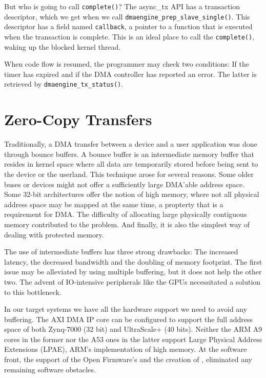 But who is going to call \texttt{complete()}? The async\_tx API has a transaction descriptor, 
which we get when we call \texttt{dmaengine\_prep\_slave\_single()}.
This descriptor has a field named \texttt{callback}, a pointer to a function
that is executed when the transaction is complete. This is an ideal place
to call the \texttt{complete()}, waking up the blocked kernel thread.

When code flow is resumed, the programmer may check two conditions:
If the timer has expired and if the DMA controller has reported an error.
The latter is retrieved by \texttt{dmaengine\_tx\_status()}.

\section{Zero-Copy Transfers}

Traditionally, a DMA transfer between a device and a user application was done through bounce buffers.
A bounce buffer is an intermediate memory buffer that resides in kernel space where all data are
temporarily stored before being sent to the device or the userland.  This technique arose for
several reasons. Some older buses or devices might not offer a sufficiently large DMA'able address space.
Some 32-bit architectures offer the notion of high memory, where not all physical address space may be
mapped at the same time, a propterty that is a requirement for DMA. The difficulty of allocating
large physically contiguous memory contributed to the problem. And finally, it is also the simplest way
of dealing with protected memory.

The use of intermediate buffers has three strong drawbacks: The increased latency, the decreased
bandwidth and the doubling of memory footprint. The first issue may be alleviated by using
multiple buffering, but it does not help the other two. The advent of IO-intensive peripherals like
the GPUs necessitated a solution to this bottleneck.

In our target systems we have all the hardware support we need to avoid any buffering.
The AXI DMA IP core can be configured to support the full address space of both Zynq-7000 (32 bit)
and UltraScale+ (40 bits). Neither the ARM A9 cores in the former nor the A53 ones in the latter
support Large Physical Address Extensions (LPAE), ARM's implementation of high memory. 
At the software front, the support of the Open Firmware's  
and the creation of , eliminated any remaining software obstacles.

